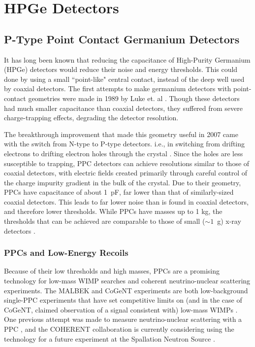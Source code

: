 
 
\chapter {HPGe Detectors}

\section{P-Type Point Contact Germanium Detectors}
It has long been known that reducing the capacitance of High-Purity Germanium (HPGe) detectors would reduce their noise and energy thresholds. This could done by using a small ``point-like" central contact, instead of the deep well used by coaxial detectors. The first attempts to make germanium detectors with point-contact geometries were made in 1989 by Luke et. al \cite{Luke1989}. Though these detectors had much smaller capacitance than coaxial detectors, they suffered from severe charge-trapping effects, degrading the detector resolution. 

The breakthrough improvement that made this geometry useful in 2007 came with the switch from N-type to P-type detectors. i.e., in switching from drifting electrons to drifting electron holes through the crystal \cite{Barbeau2007}. Since the holes are less susceptible to trapping, PPC detectors can achieve resolutions similar to those of coaxial detectors, with electric fields created primarily through careful control of the charge impurity gradient in the bulk of the crystal. Due to their geometry, PPCs have capacitance of about 1~pF, far lower than that of similarly-sized coaxial detectors. This leads to far lower noise than is found in coaxial detectors, and therefore lower thresholds. While PPCs have masses up to 1 kg, the thresholds that can be achieved are comparable to those of small ($\sim1$~g) x-ray detectors \cite{Barbeau2007}. 


\subsection{PPCs and Low-Energy Recoils}
Because of their low thresholds and high masses, PPCs are a promising technology for low-mass WIMP searches and coherent neutrino-nuclear scattering experiments. The MALBEK and CoGeNT experiments are both low-background single-PPC experiments that have set competitive limits on (and in the case of CoGeNT, claimed observation of a signal consistent with) low-mass WIMPs \cite{MALBEK2015}\cite{COGENT2011}. One previous attempt was made to measure neutrino-nuclear scattering with a PPC \cite{BarbeauThesis}, and the COHERENT collaboration is currently considering using the technology for a future experiment at the Spallation Neutron Source \cite{CoherentSnowmassWP}. 

